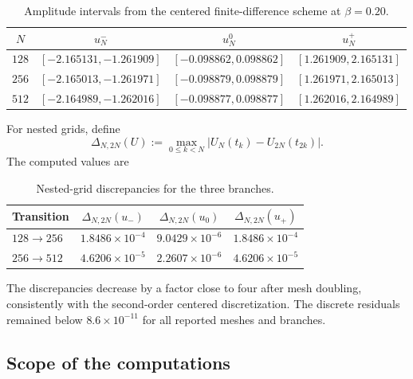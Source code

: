 \begin{table}[htbp]
\centering
\caption{Amplitude intervals from the centered finite-difference
scheme at $\beta=0.20$.}
\label{tab:numerical-mesh-intervals}
\small
\begin{tabular}{cccc}
\hline
$N$ & $u_N^-$ & $u_N^0$ & $u_N^+$
\\
\hline
$128$
& $[-2.165131,-1.261909]$
& $[-0.098862,0.098862]$
& $[1.261909,2.165131]$
\\
$256$
& $[-2.165013,-1.261971]$
& $[-0.098879,0.098879]$
& $[1.261971,2.165013]$
\\
$512$
& $[-2.164989,-1.262016]$
& $[-0.098877,0.098877]$
& $[1.262016,2.164989]$
\\
\hline
\end{tabular}
\end{table}

For nested grids, define
\begin{equation}
\label{eq:numerical-nested-grid-error}
 \Delta_{N,2N}(U)
 :=
 \max_{0\leq k<N}
 |U_N(t_k)-U_{2N}(t_{2k})|.
\end{equation}
The computed values are
\begin{table}[htbp]
\centering
\caption{Nested-grid discrepancies for the three branches.}
\label{tab:numerical-mesh-discrepancies}
\small
\begin{tabular}{lccc}
\hline
Transition
& $\Delta_{N,2N}(u_-)$
& $\Delta_{N,2N}(u_0)$
& $\Delta_{N,2N}(u_+)$
\\
\hline
$128\to256$
& $1.8486\times10^{-4}$
& $9.0429\times10^{-6}$
& $1.8486\times10^{-4}$
\\
$256\to512$
& $4.6206\times10^{-5}$
& $2.2607\times10^{-6}$
& $4.6206\times10^{-5}$
\\
\hline
\end{tabular}
\end{table}

The discrepancies decrease by a factor close to four after mesh
doubling, consistently with the second-order centered discretization.
The discrete residuals remained below $8.6\times10^{-11}$ for all
reported meshes and branches.

\subsection{Scope of the computations}
\label{subsec:numerical-scope}

